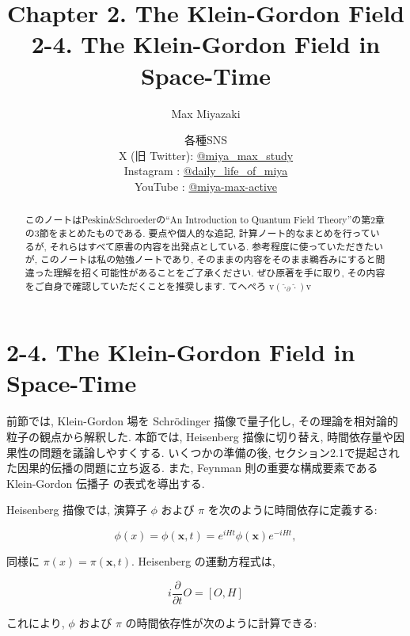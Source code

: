 \documentclass[a4paper,12pt]{article}
\title{Chapter 2. The Klein-Gordon Field\\
2-4. The Klein-Gordon Field in Space-Time}
\date{各種SNS\\
    X (旧 Twitter): \href{https://x.com/miya_max_study}{@miya\_max\_study}\\
    Instagram : \href{https://www.instagram.com/daily_life_of_miya/}{@daily\_life\_of\_miya}\\
    YouTube : \href{https://www.youtube.com/@miya-max-active}{@miya-max-active}
    }
\author{Max Miyazaki}
\begin{document}
\maketitle

\vspace{1cm}
\begin{abstract}
    このノートはPeskin\&Schroederの``An Introduction to Quantum Field Theory''の第2章の3節をまとめたものである. 要点や個人的な追記, 計算ノート的なまとめを行っているが, それらはすべて原書の内容を出発点としている. 参考程度に使っていただきたいが, このノートは私の勉強ノートであり, そのままの内容をそのまま鵜呑みにすると間違った理解を招く可能性があることをご了承ください. ぜひ原著を手に取り, その内容をご自身で確認していただくことを推奨します. てへぺろ v$({\hat{\cdot}_\partial \hat{\cdot}})$v



\end{abstract}
    
    

\newpage
\section*{2-4. The Klein-Gordon Field in Space-Time}
前節では, Klein-Gordon 場を Schr\"{o}dinger 描像で量子化し, その理論を相対論的粒子の観点から解釈した. 本節では, Heisenberg 描像に切り替え, 時間依存量や因果性の問題を議論しやすくする. いくつかの準備の後, セクション2.1で提起された因果的伝播の問題に立ち返る. また, Feynman 則の重要な構成要素である Klein-Gordon 伝播子 の表式を導出する.

Heisenberg 描像では, 演算子 $\phi$ および $\pi$ を次のように時間依存に定義する:

\begin{equation*}
\phi(x) = \phi(\mathbf{x}, t) = e^{iHt} \phi(\mathbf{x}) e^{-iHt}, \tag{2.43}
\end{equation*}

同様に $\pi(x) = \pi(\mathbf{x}, t)$. Heisenberg の運動方程式は,

\begin{equation*}
i \frac{\partial}{\partial t} O = [O, H] \tag{2.44}
\end{equation*}

これにより, $\phi$ および $\pi$ の時間依存性が次のように計算できる:
\end{document}
